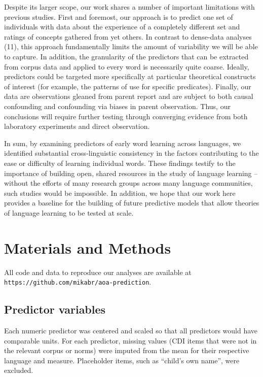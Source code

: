 \documentclass[english,man]{apa6}
\theoremstyle{definition}
\theoremstyle{definition}
\theoremstyle{definition}
\theoremstyle{remark}
\begin{document}
Despite its larger scope, our work shares a number of important
limitations with previous studies. First and foremost, our approach is
to predict one set of individuals with data about the experience of a
completely different set and ratings of concepts gathered from yet
others. In contrast to dense-data analyses (11), this approach
fundamentally limits the amount of variability we will be able to
capture. In addition, the granularity of the predictors that can be
extracted from corpus data and applied to every word is necessarily
quite coarse. Ideally, predictors could be targeted more specifically at
particular theoretical constructs of interest (for example, the patterns
of use for specific predicates). Finally, our data are observations
gleaned from parent report and are subject to both causal confounding
and confounding via biases in parent observation. Thus, our conclusions
will require further testing through converging evidence from both
laboratory experiments and direct observation.

In sum, by examining predictors of early word learning across languages,
we identified substantial cross-linguistic consistency in the factors
contributing to the ease or difficulty of learning individual words.
These findings testify to the importance of building open, shared
resources in the study of language learning -- without the efforts of
many research groups across many language communities, such studies
would be impossible. In addition, we hope that our work here provides a
baseline for the building of future predictive models that allow
theories of language learning to be tested at scale.

\newpage

\section{Materials and Methods}\label{materials-and-methods}

All code and data to reproduce our analyses are available at
\texttt{https://github.com/mikabr/aoa-prediction}.

\subsection{Predictor variables}\label{predictor-variables}

Each numeric predictor was centered and scaled so that all predictors
would have comparable units. For each predictor, missing values (CDI
items that were not in the relevant corpus or norms) were imputed from
the mean for their respective language and measure. Placeholder items,
such as \enquote{child's own name}, were excluded.
\end{document}
